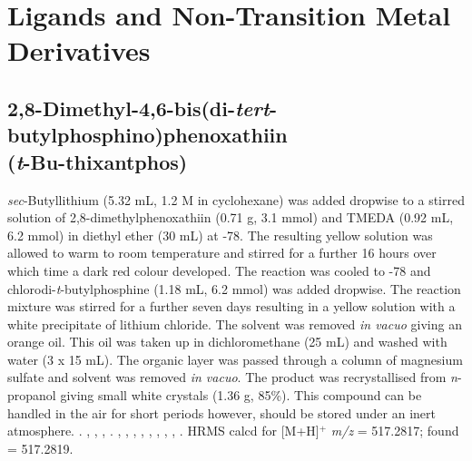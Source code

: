 \section{Ligands and Non-Transition Metal Derivatives}
\label{section:experimental:ligands}


\subsection*{2,8-Dimethyl-4,6-bis(di-\emph{tert}-butylphosphino)phenoxathiin \\(\emph{t}-Bu-thixantphos)}


\noindent{}\emph{sec}-Butyllithium (5.32 mL, 1.2 M in cyclohexane) was added dropwise to a stirred solution of 2,8-dimethylphenoxathiin (0.71 g, 3.1 mmol) and TMEDA (0.92 mL, 6.2 mmol) in diethyl ether (30 mL) at -78\degC{}.  The resulting yellow solution was allowed to warm to room temperature and stirred for a further 16 hours over which time a dark red colour developed.  The reaction was cooled to -78\degC{} and chlorodi-\emph{t}-butylphosphine (1.18 mL, 6.2 mmol) was added dropwise.  The reaction mixture was stirred for a further seven days resulting in a yellow solution with a white precipitate of lithium chloride.  The solvent was removed \emph{in vacuo} giving an orange oil.  This oil was taken up in dichloromethane (25 mL) and washed with water (3 x 15 mL).  The organic layer was passed through a column of magnesium sulfate and solvent was removed \emph{in vacuo}.  The product was recrystallised from \emph{n}-propanol giving small white crystals (1.36 g, 85\%).  This compound can be handled in the air for short periods however, should be stored under an inert atmosphere.
.
,
,
,
.
,
,
,
,
,
,
,
,
.
HRMS calcd for  [M+H]$^+$ \emph{m/z} = 517.2817; found = 517.2819.

